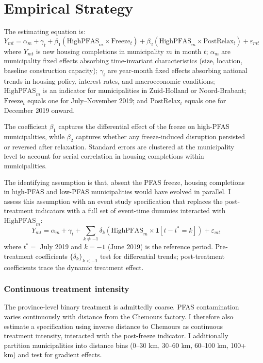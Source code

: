 \documentclass[12pt]{article}
\begin{document}


\section{Empirical Strategy}

The estimating equation is:
\begin{equation}
Y_{mt} = \alpha_m + \gamma_t + \beta_1 (\text{HighPFAS}_m \times \text{Freeze}_t) + \beta_2 (\text{HighPFAS}_m \times \text{PostRelax}_t) + \varepsilon_{mt}
\label{eq:main}
\end{equation}
where $Y_{mt}$ is new housing completions in municipality $m$ in month $t$; $\alpha_m$ are municipality fixed effects absorbing time-invariant characteristics (size, location, baseline construction capacity); $\gamma_t$ are year-month fixed effects absorbing national trends in housing policy, interest rates, and macroeconomic conditions; $\text{HighPFAS}_m$ is an indicator for municipalities in Zuid-Holland or Noord-Brabant; $\text{Freeze}_t$ equals one for July--November 2019; and $\text{PostRelax}_t$ equals one for December 2019 onward.

The coefficient $\beta_1$ captures the differential effect of the freeze on high-PFAS municipalities, while $\beta_2$ captures whether any freeze-induced disruption persisted or reversed after relaxation. Standard errors are clustered at the municipality level to account for serial correlation in housing completions within municipalities.

The identifying assumption is that, absent the PFAS freeze, housing completions in high-PFAS and low-PFAS municipalities would have evolved in parallel. I assess this assumption with an event study specification that replaces the post-treatment indicators with a full set of event-time dummies interacted with $\text{HighPFAS}_m$:
\begin{equation}
Y_{mt} = \alpha_m + \gamma_t + \sum_{k \neq -1} \delta_k (\text{HighPFAS}_m \times \mathbf{1}[t - t^* = k]) + \varepsilon_{mt}
\label{eq:eventstudy}
\end{equation}
where $t^* = $ July 2019 and $k = -1$ (June 2019) is the reference period. Pre-treatment coefficients $\{\delta_k\}_{k < -1}$ test for differential trends; post-treatment coefficients trace the dynamic treatment effect.

\subsubsection*{Continuous treatment intensity} The province-level binary treatment is admittedly coarse. PFAS contamination varies continuously with distance from the Chemours factory. I therefore also estimate a specification using inverse distance to Chemours as continuous treatment intensity, interacted with the post-freeze indicator. I additionally partition municipalities into distance bins (0--30 km, 30--60 km, 60--100 km, 100+ km) and test for gradient effects.
\end{document}
